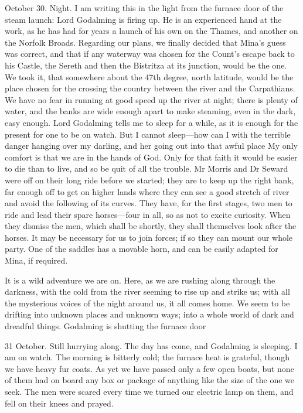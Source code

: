 \begin{diary}{October 30. Night.}
I am writing this in the light from the furnace door of the steam launch: Lord Godalming is firing up. He is an experienced hand at the work, as he has had for years a launch of his own on the Thames, and another on the Norfolk Broads. Regarding our plans, we finally decided that Mina's guess was correct, and that if any waterway was chosen for the Count's escape back to his Castle, the Sereth and then the Bistritza at its junction, would be the one. We took it, that somewhere about the 47th degree, north latitude, would be the place chosen for the crossing the country between the river and the Carpathians. We have no fear in running at good speed up the river at night; there is plenty of water, and the banks are wide enough apart to make steaming, even in the dark, easy enough. Lord Godalming tells me to sleep for a while, as it is enough for the present for one to be on watch. But I cannot sleep—how can I with the terrible danger hanging over my darling, and her going out into that awful place My only comfort is that we are in the hands of God. Only for that faith it would be easier to die than to live, and so be quit of all the trouble. Mr Morris and Dr Seward were off on their long ride before we started; they are to keep up the right bank, far enough off to get on higher lands where they can see a good stretch of river and avoid the following of its curves. They have, for the first stages, two men to ride and lead their spare horses—four in all, so as not to excite curiosity. When they dismiss the men, which shall be shortly, they shall themselves look after the horses. It may be necessary for us to join forces; if so they can mount our whole party. One of the saddles has a movable horn, and can be easily adapted for Mina, if required.

It is a wild adventure we are on. Here, as we are rushing along through the darkness, with the cold from the river seeming to rise up and strike us; with all the mysterious voices of the night around us, it all comes home. We seem to be drifting into unknown places and unknown ways; into a whole world of dark and dreadful things. Godalming is shutting the furnace door
\end{diary}

 

\begin{diary}{31 October.}
Still hurrying along. The day has come, and Godalming is sleeping. I am on watch. The morning is bitterly cold; the furnace heat is grateful, though we have heavy fur coats. As yet we have passed only a few open boats, but none of them had on board any box or package of anything like the size of the one we seek. The men were scared every time we turned our electric lamp on them, and fell on their knees and prayed.
\end{diary}

